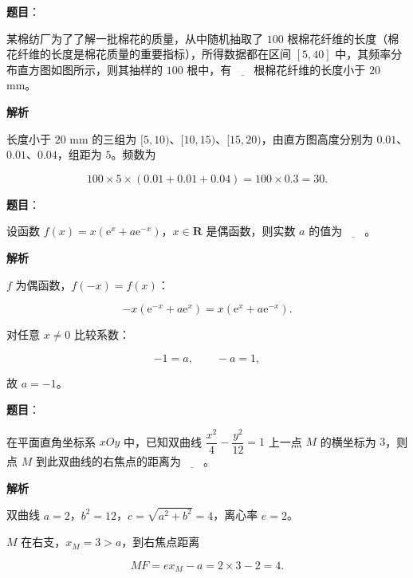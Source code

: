 \begin{answer}

\textbf{题目}：

某棉纺厂为了了解一批棉花的质量，从中随机抽取了 $100$ 根棉花纤维的长度（棉花纤维的长度是棉花质量的重要指标），所得数据都在区间 $[5,40]$ 中，其频率分布直方图如图所示，则其抽样的 $100$ 根中，有$\underline{\qquad}$根棉花纤维的长度小于 $20$ mm。
\nopagebreak[4]
\begin{center}\end{center}
\nopagebreak[4]
\textbf{解析}

长度小于 $20$ mm 的三组为 $[5,10)$、$[10,15)$、$[15,20)$，由直方图高度分别为 $0.01$、$0.01$、$0.04$，组距为 $5$。频数为

\nopagebreak[4]
\[100\times5\times(0.01+0.01+0.04)=100\times0.3=30.\]


\end{answer}
\begin{answer}

\textbf{题目}：

设函数 $f(x)=x(\mathrm e^x+a\mathrm e^{-x})$，$x\in\mathbf R$ 是偶函数，则实数 $a$ 的值为$\underline{\qquad}$。

\textbf{解析}

$f$ 为偶函数，$f(-x)=f(x)$：

\nopagebreak[4]
\[-x(\mathrm e^{-x}+a\mathrm e^x)=x(\mathrm e^x+a\mathrm e^{-x}).\]

对任意 $x\neq0$ 比较系数：

\nopagebreak[4]
\[-1=a,\qquad -a=1,\]

故 $a=-1$。


\end{answer}
\begin{answer}

\textbf{题目}：

在平面直角坐标系 $xOy$ 中，已知双曲线 $\dfrac{x^2}{4}-\dfrac{y^2}{12}=1$ 上一点 $M$ 的横坐标为 $3$，则点 $M$ 到此双曲线的右焦点的距离为$\underline{\qquad}$。

\textbf{解析}

双曲线 $a=2$，$b^2=12$，$c=\sqrt{a^2+b^2}=4$，离心率 $e=2$。

$M$ 在右支，$x_M=3>a$，到右焦点距离

\nopagebreak[4]
\[MF=ex_M-a=2\times3-2=4.\]


\end{answer}
